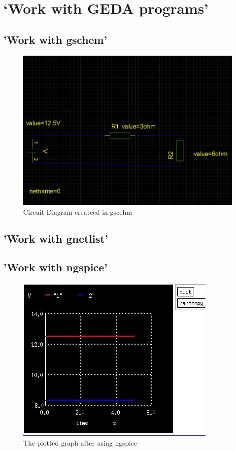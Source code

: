 \documentclass{report}
\begin{document}
\section{‘Work with GEDA programs'}
\subsection{'Work with gschem'}
\begin{figure}[hbt!]
 \centering
 \caption{Circuit Diagram createed in gscehm}
\includegraphics[width=\textwidth]{01.jpg}
 \end{figure}
\subsection{'Work with gnetlist'}


\subsection{'Work with ngspice'}
\begin{figure}[hbt!]
 \centering
  \caption{The plotted graph after using ngspice}
\includegraphics[width=\textwidth]{02.jpg}
 \end{figure}
\end{document}
